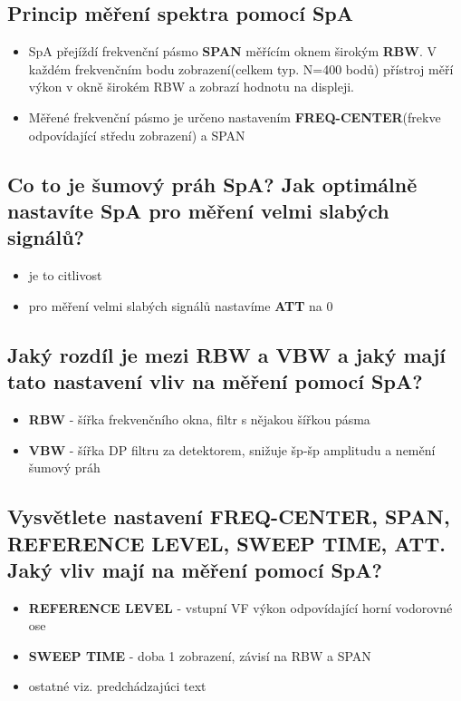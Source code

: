 \documentclass[a4paper]{article}
\begin{document}
\subsection{\textbf{Princip měření spektra pomocí SpA}}
\begin{itemize}
	\item SpA přejíždí frekvenční pásmo \textbf{SPAN} měřícím oknem širokým \textbf{RBW}. V každém frekvenčním bodu zobrazení(celkem typ. N=400 bodů) přístroj měří výkon v okně širokém RBW a zobrazí hodnotu na displeji.
	\item Měřené frekvenční pásmo je určeno nastavením \textbf{FREQ-CENTER}(frekve odpovídající středu zobrazení) a SPAN 
\end{itemize}
\subsection{\textbf{Co to je šumový práh SpA? Jak optimálně nastavíte SpA pro měření velmi slabých signálů?}}
\begin{itemize}
	\item je to citlivost
	\item pro měření velmi slabých signálů nastavíme \textbf{ATT} na 0
\end{itemize}
\subsection{\textbf{Jaký rozdíl je mezi RBW a VBW a jaký mají tato nastavení vliv na měření pomocí SpA?}}
\begin{itemize}
	\item \textbf{RBW} - šířka frekvenčního okna, filtr s nějakou šířkou pásma
	\item \textbf{VBW} - šířka DP filtru za detektorem, snižuje šp-šp amplitudu a nemění šumový práh
\end{itemize}
\subsection{\textbf{Vysvětlete nastavení FREQ-CENTER, SPAN, REFERENCE LEVEL, SWEEP TIME, ATT. Jaký vliv mají na měření pomocí SpA?}}
\begin{itemize}
	\item \textbf{REFERENCE LEVEL} - vstupní VF výkon odpovídající horní vodorovné ose
	\item \textbf{SWEEP TIME} - doba 1 zobrazení, závisí na RBW a SPAN
	\item ostatné viz. predchádzajúci text
\end{itemize}
\end{document}
